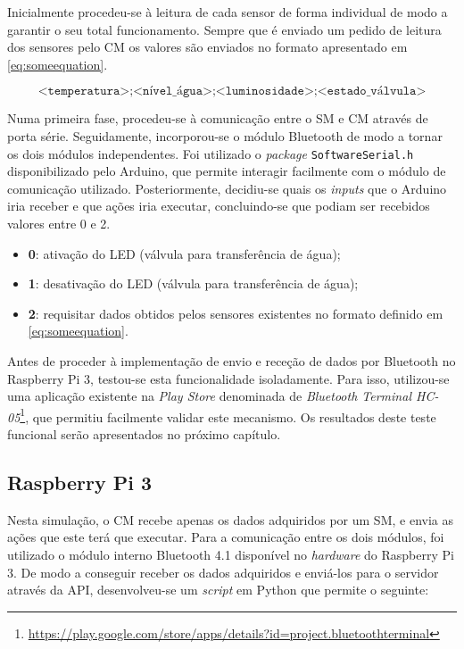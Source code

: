 Inicialmente procedeu-se à leitura de cada sensor de forma individual de modo a garantir o seu total funcionamento. Sempre que é enviado um pedido de leitura dos sensores pelo \acl{CM} os valores são enviados no formato apresentado em \ref{eq:someequation}.

\begin{equation} 
\label{eq:someequation}
\texttt{<temperatura>;<nível\_água>;<luminosidade>;<estado\_válvula>}
\end{equation}



Numa primeira fase, procedeu-se à comunicação entre o \acl{SM} e \acl{CM} através de porta série. Seguidamente, incorporou-se o módulo Bluetooth de modo a tornar os dois módulos independentes. Foi utilizado o  \textit{package} \texttt{SoftwareSerial.h} disponibilizado pelo Arduino, que permite interagir facilmente com o módulo de comunicação utilizado. Posteriormente, decidiu-se quais os \textit{inputs} que o Arduino iria receber e que ações iria executar, concluindo-se que podiam ser recebidos valores entre 0 e 2. 


\begin{itemize}
	\item \textbf{0}: ativação do \ac{LED} (válvula para transferência de água); 
	\item \textbf{1}: desativação do \ac{LED} (válvula para transferência de água); 
	\item \textbf{2}: requisitar dados obtidos pelos sensores existentes no formato definido em \ref{eq:someequation}. 
\end{itemize}

Antes de proceder à implementação de envio e receção de dados por Bluetooth no Raspberry Pi 3, testou-se esta funcionalidade isoladamente. Para isso, utilizou-se uma aplicação existente na \textit{Play Store} denominada  de \textit{Bluetooth Terminal HC-05}\footnote{\url{https://play.google.com/store/apps/details?id=project.bluetoothterminal}}, que permitiu facilmente validar este mecanismo. Os resultados deste teste funcional serão apresentados no próximo capítulo. 



\subsection{Raspberry Pi 3}

Nesta simulação, o \acl{CM} recebe apenas os dados adquiridos por um \acl{SM}, e envia as ações que este terá que executar.  Para a comunicação entre os dois módulos, foi utilizado o módulo interno Bluetooth 4.1 disponível no \textit{hardware} do Raspberry Pi 3. De modo a conseguir receber os dados adquiridos e enviá-los para o servidor através da \ac{API}, desenvolveu-se um \textit{script} em Python que permite o seguinte: 



